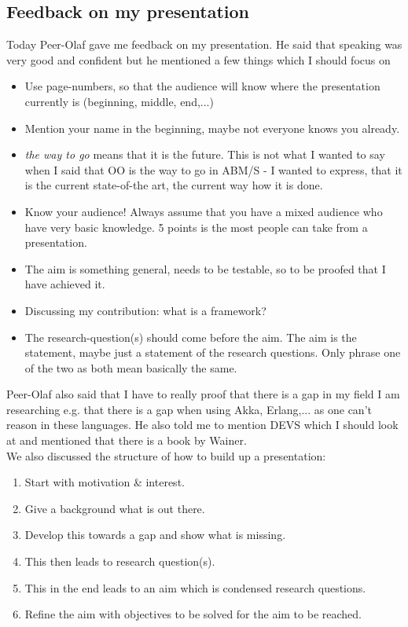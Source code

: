 \subsection*{Feedback on my presentation}
Today Peer-Olaf gave me feedback on my presentation. He said that speaking was very good and confident but he mentioned a few things which I should focus on

\begin{itemize}
\item Use page-numbers, so that the audience will know where the presentation currently is (beginning, middle, end,...)
\item Mention your name in the beginning, maybe not everyone knows you already.
\item \textit{the way to go} means that it is the future. This is not what I wanted to say when I said that OO is the way to go in ABM/S - I wanted to express, that it is the current state-of-the art, the current way how it is done.
\item Know your audience! Always assume that you have a mixed audience who have very basic knowledge. 5 points is the most people can take from a presentation.
\item The aim is something general, needs to be testable, so to be proofed that I have achieved it. 
\item Discussing my contribution: what is a framework?
\item The research-question(s) should come before the aim. The aim is the statement, maybe just a statement of the research questions. Only phrase one of the two as both mean basically the same.
\end{itemize}

Peer-Olaf also said that I have to really proof that there is a gap in my field I am researching e.g. that there is a gap when using Akka, Erlang,... as one can't reason in these languages. He also told me to mention DEVS which I should look at and mentioned that there is a book by Wainer. \\
We also discussed the structure of how to build up a presentation: 

\begin{enumerate}
\item Start with motivation \& interest.
\item Give a background what is out there.
\item Develop this towards a gap and show what is missing.
\item This then leads to research question(s).
\item This in the end leads to an aim which is condensed research questions.
\item Refine the aim with objectives to be solved for the aim to be reached.
\end{enumerate}


